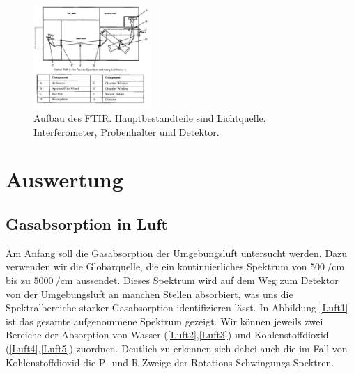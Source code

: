\documentclass[paper=a4,fontsize=10pt,DIV=18,twocolumn,parskip=half]{scrartcl}
\numberwithin{equation}{section}    %
\begin{document}
\begin{figure}
\centering
    \includegraphics[width=0.4\textwidth]{Bilder/FTIR}
    \caption{Aufbau des FTIR. Hauptbestandteile sind Lichtquelle, 
    Interferometer, Probenhalter und Detektor.}
    \label{ftir}
\end{figure}


\section{Auswertung}

\subsection{Gasabsorption in Luft}
Am Anfang soll die Gasabsorption der Umgebungsluft untersucht werden.  Dazu 
verwenden wir die Globarquelle, die ein kontinuierliches Spektrum von 
$\SI{500}{\per\centi\meter}$ bis zu $\SI{5000}{\per\centi\meter}$ aussendet.  
Dieses Spektrum wird auf dem Weg zum Detektor von der Umgebungsluft an manchen 
Stellen absorbiert, was uns die Spektralbereiche starker Gasabsorption 
identifizieren lässt.
In Abbildung \ref{Luft1} ist das gesamte aufgenommene Spektrum gezeigt.  Wir können 
jeweils zwei Bereiche der Absorption von Wasser (\cref{Luft2},\cref{Luft3}) und 
Kohlenstoffdioxid (\cref{Luft4},\cref{Luft5}) zuordnen.  Deutlich zu erkennen sich 
dabei auch die im Fall von Kohlenstoffdioxid die P- und R-Zweige der 
Rotations-Schwingungs-Spektren.
\end{document}
